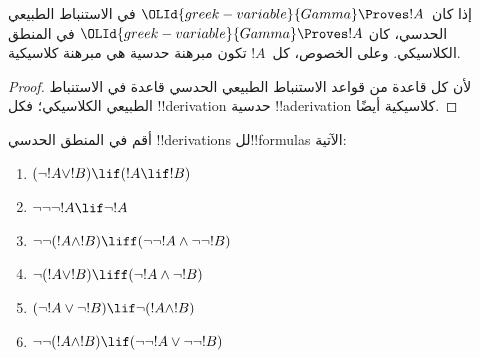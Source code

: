 \documentclass[../../../include/open-logic-section]{subfiles}
\begin{document}
\begin{prop}
  إذا كان~${\OLId{greek-variable}{Gamma}} \Proves !A$ في الاستنباط الطبيعي الحدسي، كان
  ${\OLId{greek-variable}{Gamma}} \Proves !A$ في المنطق الكلاسيكي. وعلى الخصوص، كل~$!A$
  تكون مبرهنة حدسية هي مبرهنة كلاسيكية.
\end{prop}

\begin{proof}
  لأن كل قاعدة من قواعد الاستنباط الطبيعي الحدسي قاعدة في الاستنباط
  الطبيعي الكلاسيكي؛ فكل !!{derivation} حدسية !!a{derivation}
  كلاسيكية أيضًا.
\end{proof}

\begin{prob}
  أقم في المنطق الحدسي !!{derivation}s لل!!{formula}s الآتية:
  \begin{enumerate}
    \item $(\lnot !A \lor !B) \lif (!A \lif !B)$
    \item $\lnot\lnot\lnot !A \lif \lnot !A$
    \item $\lnot\lnot (!A \land !B) \liff (\lnot\lnot !A\land \lnot \lnot !B)$
    \item $\lnot (!A \lor !B) \liff (\lnot !A \land \lnot !B)$
    \item $(\lnot !A \lor \lnot !B) \lif \lnot (!A \land !B)$
    \item $\lnot\lnot ( !A \land !B) \lif  (\lnot\lnot !A \lor
    \lnot\lnot !B)$
  \end{enumerate}
\end{prob}
\end{document}
